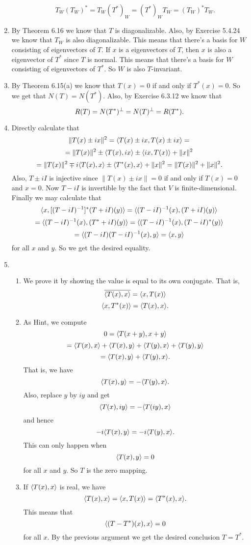 \begin{enumerate}
\begin{enumerate}
\[T_W(T_W)^*=T_W(T^*)_W=(T^*)_WT_W=(T_W)^*T_W.\]
\end{enumerate}
\item By Theorem 6.16 we know that $T$ is diagonalizable. Also, by Exercise 5.4.24 we know that $T_W$ is also diagonalizable. This means that there's a basis for $W$ consisting of eigenvectors of $T$. If $x$ is a eigenvectors of $T$, then $x$ is also a eigenvector of $T^*$ since $T$ is normal. This means that there's a basis for $W$ consisting of eigenvectors of $T^*$. So $W$ is also $T$-invariant.
\item By Theorem 6.15(a) we know that $T(x)=0$ if and only if $T^*(x)=0$. So we get that $N(T)=N(T^*)$. Also, by Exercise 6.3.12 we know that 
\[R(T)=N(T^*)^{\perp} =N(T)^{\perp} =R(T^*).\]
\item Directly calculate that 
\[\|T(x)\pm ix\|^2=\langle T(x)\pm ix,T(x)\pm ix\rangle =\]
\[=\|T(x)\|^2\pm \langle T(x),ix\rangle \pm \langle ix,T(x)\rangle +\|x\|^2\]
\[=\|T(x)\|^2\mp i\langle T(x),x\rangle \pm \langle T^*(x),x\rangle +\|x\|^2=\|T(x)\|^2+\|x\|^2.\]
Also, $T\pm iI$ is injective since $\|T(x)\pm ix\|=0$ if and only if $T(x)=0$ and $x=0$. Now $T-iI$ is invertible by the fact that $V$ is finite-dimensional. Finally we may calculate that 
\[\langle x,[(T-iI)^{-1}]^*(T+iI)(y)\rangle =\langle (T-iI)^{-1}(x),(T+iI)(y)\rangle \]
\[=\langle (T-iI)^{-1}(x),(T^*+iI)(y)\rangle =\langle (T-iI)^{-1}(x),(T-iI)^*(y)\rangle \]
\[=\langle (T-iI)(T-iI)^{-1}(x),y\rangle =\langle x,y\rangle \]
for all $x$ and $y$. So we get the desired equality.
\item \begin{enumerate}
\item We prove it by showing the value is equal to its own conjugate. That is,
\[\overline{\langle T(x),x\rangle }=\langle x,T(x)\rangle \]
\[\langle x,T^*(x)\rangle =\langle T(x),x\rangle .\]
\item As Hint, we compute 
\[0=\langle T(x+y),x+y\rangle \]
\[=\langle T(x),x\rangle +\langle T(x),y\rangle +\langle T(y),x\rangle +\langle T(y),y\rangle \]
\[=\langle T(x),y\rangle +\langle T(y),x\rangle .\]
That is, we have 
\[\langle T(x),y\rangle =-\langle T(y),x\rangle .\]
Also, replace $y$ by $iy$ and get 
\[\langle T(x),iy\rangle =-\langle T(iy),x\rangle \]
and hence
\[-i\langle T(x),y\rangle =-i\langle T(y),x\rangle .\]
This can only happen when 
\[\langle T(x),y\rangle =0\]
for all $x$ and $y$. So $T$ is the zero mapping.
\item If $\langle T(x),x\rangle $ is real, we have 
\[\langle T(x),x\rangle =\langle x,T(x)\rangle =\langle T^*(x),x\rangle .\]
This means that 
\[\langle (T-T^*)(x),x\rangle =0\]
for all $x$. By the previous argument we get the desired conclusion $T=T^*$.
\end{enumerate}

\end{enumerate}
